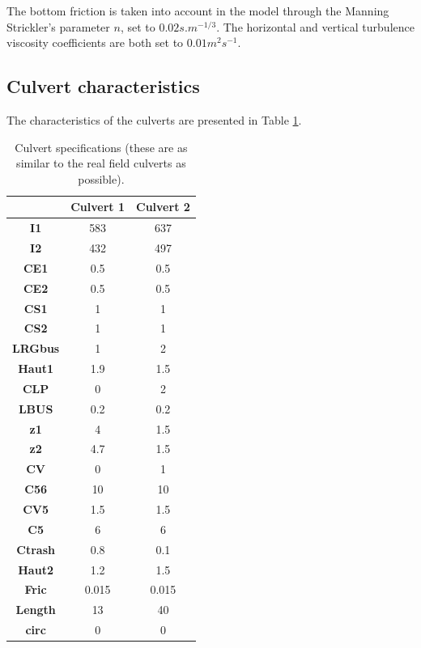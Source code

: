 The bottom friction is taken into account in the model through the Manning Strickler’s parameter $n$, set to $0.02 s.m^{-1/3}$. 
The horizontal and vertical turbulence viscosity coefficients are both set to $0.01 m^2s^{-1}$.

\subsection{Culvert characteristics}
The characteristics of the culverts are presented in Table \ref{tab:culvert_table1}.

\begin{table}[H]
\caption{Culvert specifications (these are as similar to the real field culverts as possible).}\label{tab:culvert_table1}
\begin{center}\begin{tabular}{|c|c|c|}
\hline
~ & \textbf{Culvert 1} & \textbf{Culvert 2} \\
\hline
\textbf{I1} & 583 & 637 \\
\hline
\textbf{I2}	& 432	 & 497 \\
\hline
\textbf{CE1}	& 0.5	 & 0.5 \\
\hline
\textbf{CE2}	& 0.5	 & 0.5 \\
\hline
\textbf{CS1}	& 1	 & 1 \\
\hline
\textbf{CS2}	& 1	 & 1 \\
\hline
\textbf{LRGbus}	& 1	 & 2 \\
\hline
\textbf{Haut1}	& 1.9	 & 1.5 \\
\hline
\textbf{CLP}	& 0	 & 2 \\
\hline
\textbf{LBUS}	& 0.2	 & 0.2 \\
\hline
\textbf{z1}	& 4	 & 1.5 \\
\hline
\textbf{z2}	& 4.7	 & 1.5 \\
\hline
\textbf{CV}	& 0	 & 1 \\
\hline
\textbf{C56}	& 10	 & 10 \\
\hline
\textbf{CV5}	& 1.5	 & 1.5 \\
\hline
\textbf{C5}	& 6	 & 6 \\
\hline
\textbf{Ctrash}	& 0.8	 & 0.1 \\
\hline
\textbf{Haut2}	& 1.2	 & 1.5 \\
\hline
\textbf{Fric}	& 0.015 & 0.015 \\
\hline
\textbf{Length}	& 13	 & 40 \\
\hline
\textbf{circ}	& 0	 & 0 \\
\hline
\end{tabular}\end{center}
\end{table}


